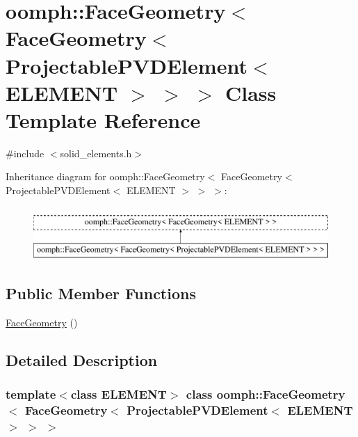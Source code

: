 \hypertarget{classoomph_1_1FaceGeometry_3_01FaceGeometry_3_01ProjectablePVDElement_3_01ELEMENT_01_4_01_4_01_4}{}\section{oomph\+:\+:Face\+Geometry$<$ Face\+Geometry$<$ Projectable\+P\+V\+D\+Element$<$ E\+L\+E\+M\+E\+NT $>$ $>$ $>$ Class Template Reference}
\label{classoomph_1_1FaceGeometry_3_01FaceGeometry_3_01ProjectablePVDElement_3_01ELEMENT_01_4_01_4_01_4}


{\ttfamily \#include $<$solid\+\_\+elements.\+h$>$}

Inheritance diagram for oomph\+:\+:Face\+Geometry$<$ Face\+Geometry$<$ Projectable\+P\+V\+D\+Element$<$ E\+L\+E\+M\+E\+NT $>$ $>$ $>$\+:\begin{figure}[H]
\begin{center}
\leavevmode
\includegraphics[height=2.000000cm]{classoomph_1_1FaceGeometry_3_01FaceGeometry_3_01ProjectablePVDElement_3_01ELEMENT_01_4_01_4_01_4}
\end{center}
\end{figure}
\subsection*{Public Member Functions}
\begin{DoxyCompactItemize}
\item 
\hyperlink{classoomph_1_1FaceGeometry_3_01FaceGeometry_3_01ProjectablePVDElement_3_01ELEMENT_01_4_01_4_01_4_a81374c0c38495f04c4ab99e62e1b1195}{Face\+Geometry} ()
\end{DoxyCompactItemize}


\subsection{Detailed Description}
\subsubsection*{template$<$class E\+L\+E\+M\+E\+NT$>$\newline
class oomph\+::\+Face\+Geometry$<$ Face\+Geometry$<$ Projectable\+P\+V\+D\+Element$<$ E\+L\+E\+M\+E\+N\+T $>$ $>$ $>$}

